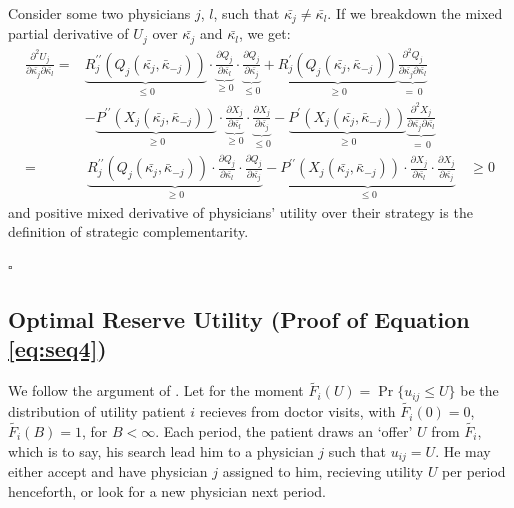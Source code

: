 \documentclass[../main.tex]{subfiles}
\begin{document}
Consider some two physicians $j$, $l$, such that $\bar{\kappa_j} \neq \bar{\kappa_l}$. If we breakdown the mixed partial derivative of $U_j$ over $\bar{\kappa_j}$ and $\bar{\kappa_l}$, we get:
\begin{align*}
\frac{\partial^2 U_{j}}{\partial\bar{\kappa_{j}} \partial\bar{\kappa_{l}}} = & 
\underbrace{R_j^{\prime \prime}(Q_j(\bar{\kappa_j}, \bar{\kappa}_{-j}))}_{\leq 0}
\cdot \underbrace{\frac{\partial Q_{j}}{\partial\bar{\kappa_{l}}}}_{\geq 0}
\cdot \underbrace{\frac{\partial Q_{j}}{\partial\bar{\kappa_{j}}}}_{\leq 0}  + 
\underbrace{R_j^{\prime} (Q_j(\bar{\kappa_j}, \bar{\kappa}_{-j}))}_{\geq 0} \underbrace{\frac{\partial^2 Q_{j}}{{\partial\bar{\kappa_{j}} \partial\bar{\kappa_{l}}}}}_{= \, 0} & \\
 & - \underbrace{P^{\prime \prime} (X_j(\bar{\kappa_j}, \bar{\kappa}_{-j}))}_{\geq 0}
\cdot \underbrace{\frac{\partial X_{j}}{\partial\bar{\kappa_{l}}}}_{\geq 0}
\cdot \underbrace{\frac{\partial X_{j}}{\partial\bar{\kappa_{j}}}}_{\leq 0}  - 
\underbrace{P^{\prime} (X_j(\bar{\kappa_j}, \bar{\kappa}_{-j}))}_{\geq 0} \underbrace{\frac{\partial^2 X_{j}}{\partial\bar{\kappa_{j}} \partial\bar{\kappa_{l}}}}_{= \, 0} &  \\
    = & \, \underbrace{{R_j^{\prime \prime}} (Q_j(\bar{\kappa_j}, \bar{\kappa}_{-j}))
    \cdot \frac{\partial Q_{j}}{\partial\bar{\kappa_{l}}}
    \cdot \frac{\partial Q_{j}}{\partial\bar{\kappa_{j}}}}_{\geq 0}  -
    \underbrace{P^{\prime \prime} (X_j(\bar{\kappa_j}, \bar{\kappa}_{-j}))
    \cdot \frac{\partial X_{j}}{\partial\bar{\kappa_{l}}}
    \cdot \frac{\partial X_{j}}{\partial\bar{\kappa_{j}}}}_{\leq 0} \, & \geq 0
\end{align*}
and positive mixed derivative of physicians' utility over their strategy is the definition of strategic complementarity.
\begin{flushright}
    $\square$
\end{flushright}

\subsection{Optimal Reserve Utility (Proof of Equation \ref{eq:seq4})}
\label{sec:sequential}

We follow the argument of \cite{sargent}. Let for the moment $\tilde{F_i}(U) = \operatorname{Pr}\{u_{ij} \leq U\}$ be the distribution of utility patient $i$ recieves from doctor visits, with $\tilde{F_i}(0) = 0$, $\tilde{F_i}(B) = 1$, for $B < \infty$. Each period, the patient draws an `offer' $U$ from $\tilde{F_i}$, which is to say, his search lead him to a physician $j$ such that $u_{ij} = U$. He may either accept and have physician $j$ assigned to him, recieving utility $U$ per period henceforth, or look for a new physician next period.
\end{document}
